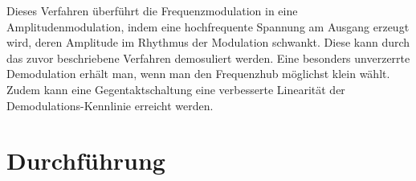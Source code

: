 Dieses Verfahren überführt die Frequenzmodulation in eine Amplitudenmodulation, indem eine hochfrequente Spannung am Ausgang erzeugt wird, deren Amplitude im Rhythmus der Modulation schwankt.
Diese kann durch das zuvor beschriebene Verfahren demosuliert werden.
Eine besonders unverzerrte Demodulation erhält man, wenn man den Frequenzhub möglichst klein wählt.
Zudem kann eine Gegentaktschaltung eine verbesserte Linearität der Demodulations-Kennlinie erreicht werden.

\section{Durchführung}
\label{sec:durchführung}
